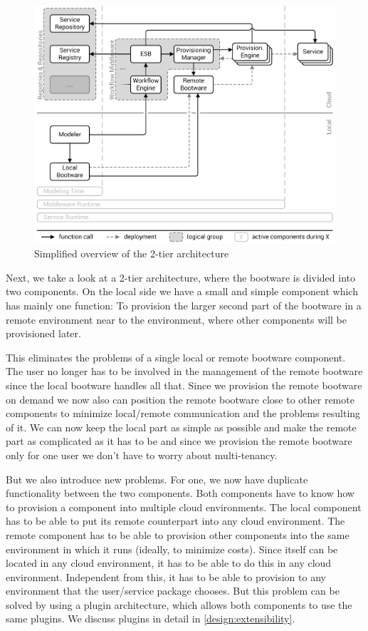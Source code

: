\begin{figure}[!htbp]
	\centering
	\includegraphics[resolution=600]{design/assets/2_tier}
	\caption{Simplified overview of the 2-tier architecture}
	\label{image:2_tier}
\end{figure}

Next, we take a look at a 2-tier architecture, where the bootware is divided into two components.
On the local side we have a small and simple component which has mainly one function: To provision the larger second part of the bootware in a remote environment near to the environment, where other components will be provisioned later.

This eliminates the problems of a single local or remote bootware component.
The user no longer has to be involved in the management of the remote bootware since the local bootware handles all that.
Since we provision the remote bootware on demand we now also can position the remote bootware close to other remote components to minimize local/remote communication and the problems resulting of it.
We can now keep the local part as simple as possible and make the remote part as complicated as it has to be and since we provision the remote bootware only for one user we don't have to worry about multi-tenancy.

But we also introduce new problems.
For one, we now have duplicate functionality between the two components.
Both components have to know how to provision a component into multiple cloud environments.
The local component has to be able to put its remote counterpart into any cloud environment.
The remote component has to be able to provision other components into the same environment in which it runs (ideally, to minimize costs).
Since itself can be located in any cloud environment, it has to be able to do this in any cloud environment.
Independent from this, it has to be able to provision to any environment that the user/service package chooses.
But this problem can be solved by using a plugin architecture, which allows both components to use the same plugins.
We discuss plugins in detail in \autoref{design:extensibility}.

